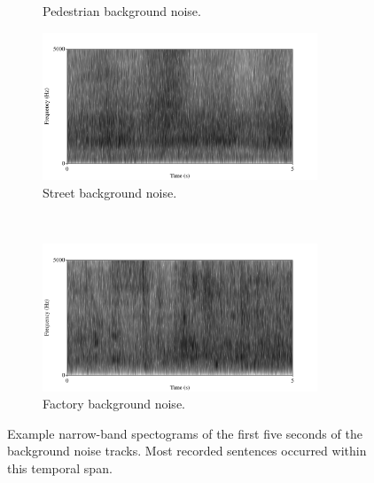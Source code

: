 \begin{figure}[h!]
\begin{subfigure}{0.475\linewidth}
  \caption{Pedestrian background noise.}
  \label{fig:ped-bkgrnd}
\end{subfigure}
\qquad
\begin{subfigure}{0.475\linewidth}
  \centering
  \includegraphics[width=0.9\textwidth]{figure/spctgrm-str-background.png}
  \caption{Street background noise.}
  \label{fig:str-bkgrnd}
\end{subfigure}%
\\[2ex]
\begin{center}
\begin{subfigure}{0.475\linewidth}
  \centering
  \includegraphics[width=0.9\textwidth]{figure/spctgrm-fac-background.png}
  \caption{Factory background noise.}
  \label{fig:fac-bkgrnd}
\end{subfigure}
\end{center}
\caption{Example narrow-band spectograms of the first five seconds of the background noise tracks. Most recorded sentences occurred within this temporal span.}
\label{fig:bkgrnd-noises}
\end{figure}

